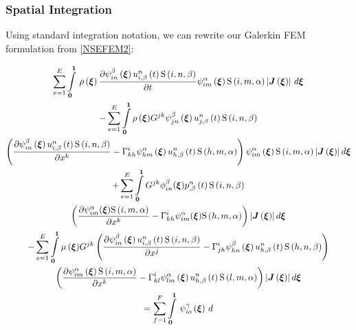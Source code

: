 \subsubsection{Spatial Integration}

Using standard integration notation, we can rewrite our Galerkin FEM formulation from \eqref{NSEFEM2}:


\begin{multline}
 \label{NSEFEM3}
  \dsum_{e=1}^{E}\gint{\vect{0}}{\vect{1}}{\fnof{\rho}{\vect{\xi}}\delby{\idxgbfn{i}{n}{\beta}{\vect{\xi}}
      \fnof{\idxnodedof{u}{i}{n}{\beta}}{t}\idxgsf{i}{n}{\beta}}{t}
    \idxgbfn{i}{m}{\alpha}{\vect{\xi}}\idxgsf{i}{m}{\alpha}
    \abs{\fnof{\matr{J}}{\vect{\xi}}}}{\vect{\xi}}\\
  - \dsum_{e=1}^{E}\dintl{\vect{0}}{\vect{1}}{\fnof{\rho}{\vect{\xi}}}G^{jk}\idxgbfn{j}{n}{\beta}{\vect{\xi}}
  \fnof{\idxnodedof{u}{j}{n}{\beta}}{t}\idxgsf{i}{n}{\beta}\\
  \pbrac{\delby{\idxgbfn{i}{n}{\beta}{\vect{\xi}}\fnof{\idxnodedof{u}{i}{n}{\beta}}{t}
      \idxgsf{i}{n}{\beta}}{x^{k}}-\christoffel{i}{k}{h}\idxgbfn{h}{m}{\alpha}{\vect{\xi}}
    \fnof{\idxnodedof{u}{h}{n}{\beta}}{t}\idxgsf{h}{m}{\alpha}}
  \idxgbfn{i}{m}{\alpha}{\vect{\xi}}\idxgsf{i}{m}{\alpha}
  \abs{\fnof{\matr{J}}{\vect{\xi}}}d\vect{\xi}\\
  +\dsum_{e=1}^{E}\dintl{\vect{0}}{\vect{1}}G^{jk}\phi_{in}^{\beta}({\vect{\xi}})
  \fnof{\idxnodedof{p}{}{n}{\beta}}{t}\idxgsf{i}{n}{\beta}\\
  \pbrac{\delby{\psi_{im}^{\alpha}({\vect{\xi}})\idxgsf{i}{m}{\alpha}}{x^{k}}-
  \christoffel{i}{k}{h}\psi_{im}^{\alpha}({\vect{\xi}})\idxgsf{h}{m}{\alpha}
    }\abs{\fnof{\matr{J}}{\vect{\xi}}}d\vect{\xi}\\
  -\dsum_{e=1}^{E}\dintl{\vect{0}}{\vect{1}}{\fnof{\mu}{\vect{\xi}}}G^{jk}\pbrac{\delby{\idxgbfn{i}{n}{\beta}{\vect{\xi}}
     \fnof{\idxnodedof{u}{i}{n}{\beta}}{t}\idxgsf{i}{n}{\beta}}{x^{j}}-
      \christoffel{i}{j}{h}\idxgbfn{h}{n}{\beta}{\vect{\xi}}
      \fnof{\idxnodedof{u}{h}{n}{\beta}}{t}\idxgsf{h}{n}{\beta}} \\
    \pbrac{\delby{\idxgbfn{i}{m}{\alpha}{\vect{\xi}}\idxgsf{i}{m}{\alpha}}{x^{k}}-
      \christoffel{i}{k}{l}\idxgbfn{l}{m}{\alpha}{\vect{\xi}}
      \fnof{\idxnodedof{u}{h}{n}{\beta}}{t}
      \idxgsf{l}{m}{\alpha}}\abs{\fnof{\matr{J}}{\vect{\xi}}}d\vect{\xi}\\
  =\dsum_{f=1}^{F}\gint{\vect{0}}{\vect{1}}{\idxgbfn{i}{o}{\gamma}{\vect{\xi}}
}
\end{multline}
